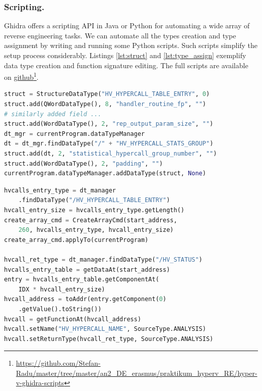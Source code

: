 \documentclass[runningheads]{llncs}
\newcommand{\cc}{\lstinline[mathescape]}
\begin{document}
\vspace{-2mm}
\subsubsection{Scripting.}

Ghidra offers a scripting API in Java or Python for automating a wide array of
reverse engineering tasks. We can automate all the types creation and type
assignment by writing and running some Python scripts. Such scripts simplify
the setup process considerably. Listings \ref{lst:struct} and
\ref{lst:type_assign} exemplify data type creation and function signature
editing. The full scripts are available on
\href{https://github.com/Stefan-Radu/master/tree/master/an2_DE_erasmus/praktikum_hyperv_RE/hyper-v-ghidra-scripts}{github}\footnote{\url{https://github.com/Stefan-Radu/master/tree/master/an2_DE_erasmus/praktikum_hyperv_RE/hyper-v-ghidra-scripts}}.

\vspace{3mm}

\begin{lstlisting}[language=python, label={lst:struct},
    caption={Python script which creates the \cc{HV_HYPERCALL_TABLE_ENTRY} 
    structure.}]
struct = StructureDataType("HV_HYPERCALL_TABLE_ENTRY", 0)
struct.add(QWordDataType(), 8, "handler_routine_fp", "")
# similarly added field ...
struct.add(WordDataType(), 2, "rep_output_param_size", "")
dt_mgr = currentProgram.dataTypeManager
dt = dt_mgr.findDataType("/" + "HV_HYPERCALL_STATS_GROUP")
struct.add(dt, 2, "statistical_hypercall_group_number", "")
struct.add(WordDataType(), 2, "padding", "")
currentProgram.dataTypeManager.addDataType(struct, None)
\end{lstlisting}

\begin{lstlisting}[language=python, label={lst:type_assign},
    caption={Example of array creation and changing the name and return type
    of a hypercall function reference.}]
hvcalls_entry_type = dt_manager
    .findDataType("/HV_HYPERCALL_TABLE_ENTRY")
hvcall_entry_size = hvcalls_entry_type.getLength()
create_array_cmd = CreateArrayCmd(start_address,
    260, hvcalls_entry_type, hvcall_entry_size)
create_array_cmd.applyTo(currentProgram)

hvcall_ret_type = dt_manager.findDataType("/HV_STATUS")
hvcalls_entry_table = getDataAt(start_address)
entry = hvcalls_entry_table.getComponentAt(
    IDX * hvcall_entry_size)
hvcall_address = toAddr(entry.getComponent(0)
    .getValue().toString())
hvcall = getFunctionAt(hvcall_address)
hvcall.setName("HV_HYPERCALL_NAME", SourceType.ANALYSIS)
hvcall.setReturnType(hvcall_ret_type, SourceType.ANALYSIS)
\end{lstlisting}
\end{document}
